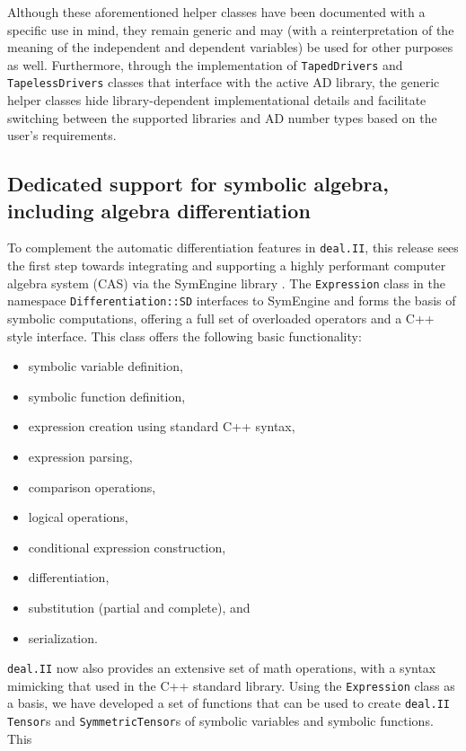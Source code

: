 \documentclass{ansarticle-preprint}
\newcommand{\specialword}[1]{\texttt{#1}}
\newcommand{\dealii}{{\specialword{deal.II}}\xspace}
\begin{document}
Although these aforementioned helper classes have been documented with a specific
use in mind, they remain generic and may (with a reinterpretation of the meaning of
the independent and dependent variables) be used for other purposes as well.
Furthermore, through the implementation of \texttt{TapedDrivers} and
\texttt{TapelessDrivers} classes that interface with the active AD library, the
generic helper classes hide library-dependent implementational details and facilitate
switching between the supported libraries and AD number types based on the
user's requirements.

\subsection{Dedicated support for symbolic algebra, including algebra differentiation}
\label{subsec:sd}
To complement the automatic differentiation features in \dealii{}, this release sees
the first step towards integrating and supporting a highly performant computer algebra
system (CAS) via the SymEngine library \cite{symengine-web-page}.
The \texttt{Expression} class in the namespace \texttt{Differentiation::SD} interfaces
to SymEngine and forms the basis of symbolic computations, offering a full set of
overloaded operators and a C++ style interface. This class offers the following
basic functionality:
\begin{itemize}
\item symbolic variable definition,
\item symbolic function definition,
\item expression creation using standard C++ syntax,
\item expression parsing,
\item comparison operations,
\item logical operations,
\item conditional expression construction,
\item differentiation,
\item substitution (partial and complete), and
\item serialization.
\end{itemize}
\dealii{} now also provides an extensive set of math operations, with a syntax mimicking that used
in the C++ standard library. Using the \texttt{Expression} class as a basis, we
have developed a set of functions that can be used to create \dealii{} \texttt{Tensor}s
and \texttt{SymmetricTensor}s of symbolic variables and symbolic functions. This
\end{document}
